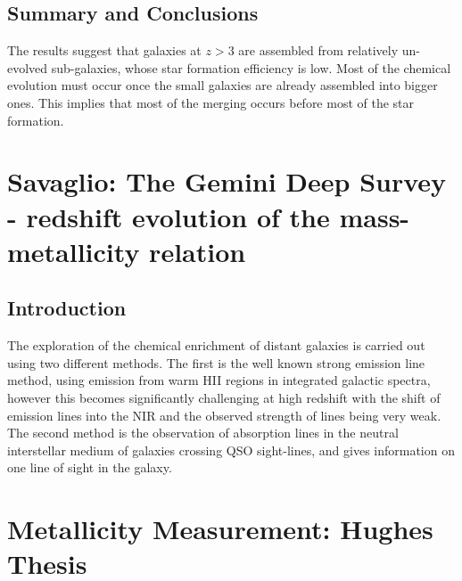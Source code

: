 \documentclass{literature}
\begin{document}
\subsection{Summary and Conclusions}
The results suggest that galaxies at $z > 3$ are assembled from relatively un-evolved sub-galaxies, whose star formation efficiency is low. Most of the chemical evolution must occur once the small galaxies are already assembled into bigger ones. This implies that most of the merging occurs before most of the star formation.

\section{Savaglio: The Gemini Deep Survey - redshift evolution of the mass-metallicity relation}\label{sec:savaglio metallicity paper}
\subsection{Introduction}
The exploration of the chemical enrichment of distant galaxies is carried out using two different methods. The first is the well known strong emission line method, using emission from warm HII regions in integrated galactic spectra, however this becomes significantly challenging at high redshift with the shift of emission lines into the NIR and the observed strength of lines being very weak. The second method is the observation of absorption lines in the neutral interstellar medium of galaxies crossing QSO sight-lines, and gives information on one line of sight in the galaxy.












\section{Metallicity Measurement: Hughes Thesis}\label{sec:Hughes thesis}
\end{document}
